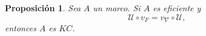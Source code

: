 \documentclass[12pt]{article}
\newtheorem{cor}[thm]{Corolario}
\newtheorem{prop}[thm]{Proposición}
\begin{document}

\begin{prop}\label{prop:KC}
Sea $A$ un marco. Si $A$ es eficiente y 
\begin{equation}\label{eq:KC}
\mathcal{U}\circ v_F=v_\nabla\circ \mathcal{U},
\end{equation}
entonces $A$ es $KC$.
\end{prop}
\end{document}
